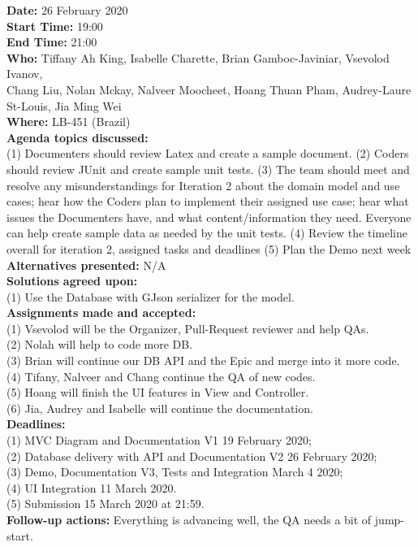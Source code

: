 \documentclass[12pt]{article}
\begin{document}
\newpage

{\bf Date:} 26 February 2020\\
{\bf Start Time:} 19:00\\
{\bf End Time:} 21:00\\
{\bf Who:} Tiffany Ah King, Isabelle Charette, Brian Gamboc-Javiniar, Vsevolod Ivanov,\\
Chang Liu, Nolan Mckay, Nalveer Moocheet, Hoang Thuan Pham, Audrey-Laure St-Louis, Jia Ming Wei\\
{\bf Where:} LB-451 (Brazil)\\
{\bf Agenda topics discussed:} \\
(1) Documenters should review Latex and create a sample document.
(2) Coders should review JUnit and create sample unit tests.
(3) The team should meet and resolve any misunderstandings for Iteration 2 about the domain model and use cases; hear how the Coders plan to implement their assigned use case; hear what issues the Documenters have, and what content/information they need. Everyone can help create sample data as needed by the unit tests.
(4) Review the timeline overall for iteration 2, assigned tasks and deadlines
(5) Plan the Demo next week\\
{\bf Alternatives presented:} N/A\\
{\bf Solutions agreed upon:} \\
(1) Use the Database with GJson serializer for the model. \\
{\bf Assignments made and accepted:} \\
(1) Vsevolod will be the Organizer, Pull-Request reviewer and help QAs.\\
(2) Nolah will help to code more DB.\\
(3) Brian will continue our DB API and the Epic and merge into it more code.\\
(4) Tifany, Nalveer and Chang continue the QA of new codes.\\
(5) Hoang will finish the UI features in View and Controller.\\
(6) Jia, Audrey and Isabelle will continue the documentation.\\
{\bf Deadlines:} \\
(1) MVC Diagram and Documentation V1 19 February 2020;\\
(2) Database delivery with API and Documentation V2 26 February 2020;\\
(3) Demo, Documentation V3, Tests and Integration March 4 2020; \\
(4) UI Integration 11 March 2020. \\
(5) Submission 15 March 2020 at 21:59. \\
{\bf Follow-up actions:} Everything is advancing well, the QA needs a bit of jump-start.\\
\end{document}
